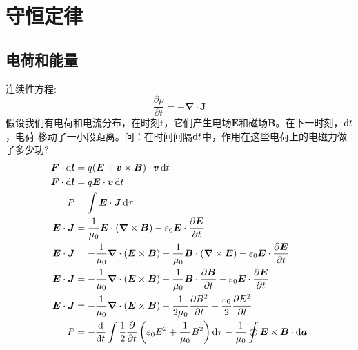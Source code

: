 \cleardoublepage

\section{守恒定律}
\subsection{电荷和能量}
连续性方程:
\begin{equation}
    \frac{\partial \rho}{\partial t}=-\boldsymbol{\nabla}\cdot\boldsymbol{J}
\end{equation}
假设我们有电荷和电流分布，在时刻t，它们产生电场$\boldsymbol{E}$和磁场$\boldsymbol{B}$。在下一时刻，$\dif t$，电荷
移动了一小段距离。问：在时间间隔$\dif t$中，作用在这些电荷上的电磁力做了多少功?
\begin{align*}
    \boldsymbol F\cdot\dif\boldsymbol{l}&=q(\boldsymbol{E}+\boldsymbol{v}\times\boldsymbol{B})\cdot\boldsymbol{v}\dif t\\
    \boldsymbol F\cdot\dif\boldsymbol{l}&=q\boldsymbol{E}\cdot\boldsymbol{v}\dif t\\
    P&=\int \boldsymbol{E}\cdot\boldsymbol{J}\dif\tau\\
    \boldsymbol{E}\cdot\boldsymbol{J}&=\frac{1}{\mu_0}\boldsymbol{E}\cdot(\boldsymbol{\nabla}\times\boldsymbol{B})
    -\varepsilon_0\boldsymbol{E}\cdot\frac{\partial \boldsymbol{E}}{\partial t}\\
    \boldsymbol{E}\cdot\boldsymbol{J}&=-\frac{1}{\mu_0}\boldsymbol{\nabla}\cdot(\boldsymbol{E}\times\boldsymbol{B})
    +\frac{1}{\mu_0}\boldsymbol{B}\cdot(\boldsymbol{\nabla}\times\boldsymbol{E})
    -\varepsilon_0\boldsymbol{E}\cdot\frac{\partial \boldsymbol{E}}{\partial t}\\
    \boldsymbol{E}\cdot\boldsymbol{J}&=-\frac{1}{\mu_0}\boldsymbol{\nabla}\cdot(\boldsymbol{E}\times\boldsymbol{B})
    -\frac{1}{\mu_0}\boldsymbol{B}\cdot\frac{\partial \boldsymbol{B}}{\partial t}
    -\varepsilon_0\boldsymbol{E}\cdot\frac{\partial \boldsymbol{E}}{\partial t}\\
    \boldsymbol{E}\cdot\boldsymbol{J}&=-\frac{1}{\mu_0}\boldsymbol{\nabla}\cdot(\boldsymbol{E}\times\boldsymbol{B})
    -\frac{1}{2\mu_0}\frac{\partial B^2}{\partial t}
    -\frac{\varepsilon_0}{2}\frac{\partial E^2}{\partial t}\\
    P&=-\frac{\dif}{\dif t}\int\frac{1}{2}\frac{\partial }{\partial t}\left(\varepsilon_0E^2+\frac{1}{\mu_0}B^2\right)\dif\tau-\frac{1}{\mu_0}\oint\boldsymbol{E}\times\boldsymbol{B}\cdot\dif\boldsymbol{a}
\end{align*}
